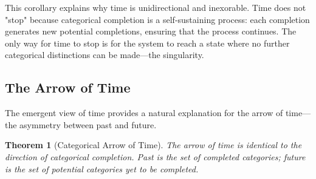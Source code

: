 \documentclass[12pt,a4paper]{article}
\newtheorem{theorem}{Theorem}[section]
\theoremstyle{definition}
\theoremstyle{remark}
\begin{document}
This corollary explains why time is unidirectional and inexorable. Time does not "stop" because categorical completion is a self-sustaining process: each completion generates new potential completions, ensuring that the process continues. The only way for time to stop is for the system to reach a state where no further categorical distinctions can be made—the singularity.

\subsection{The Arrow of Time}

The emergent view of time provides a natural explanation for the arrow of time—the asymmetry between past and future.

\begin{theorem}[Categorical Arrow of Time]
\label{thm:categorical_arrow}
The arrow of time is identical to the direction of categorical completion. Past is the set of completed categories; future is the set of potential categories yet to be completed.
\end{theorem}
\end{document}
